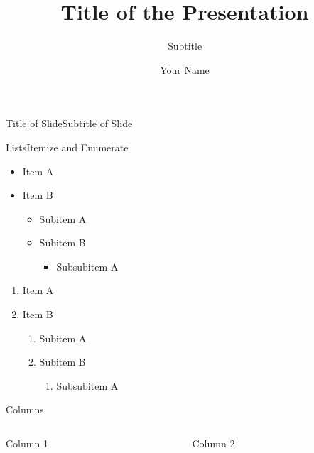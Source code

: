 \documentclass[RAIbeamer%
              ,optBiber%
              ,optBibstyleAlphabetic%
              ,optBeamerClassicFormat%
              ]{RAIlatex}%
\title{Title of the Presentation}%
\subtitle{Subtitle}%
\author{Your Name}%
\date{\RAIutilsDate{1}{1}{2017}}%
\begin{document}
%
%
\RAIbeamerTitlePageDefault%
%
\begin{frame}{Title of Slide}{Subtitle of Slide}%
    \blindtext%
\end{frame}%
%
\begin{frame}{Lists}{Itemize and Enumerate}%
    \begin{itemize}
        \item Item A
        \item Item B
        \begin{itemize}
            \item Subitem A
            \item Subitem B
            \begin{itemize}
                \item Subsubitem A
            \end{itemize}
        \end{itemize}
    \end{itemize}
    \begin{enumerate}
        \item Item A
        \item Item B
        \begin{enumerate}
            \item Subitem A
            \item Subitem B
            \begin{enumerate}
                \item Subsubitem A
            \end{enumerate}
        \end{enumerate}
    \end{enumerate}
\end{frame}%
%
\begin{frame}{Columns}%
    \begin{columns}[t,onlytextwidth]%
        \begin{column}[t]{0.48\textwidth}%
            Column 1%
        \end{column}%
        \begin{column}[t]{0.48\textwidth}%
            Column 2%
        \end{column}%
    \end{columns}%
\end{frame}%
%
%
\end{document}

